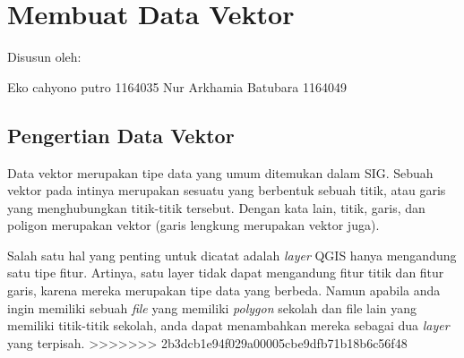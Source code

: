 

\section{Membuat Data Vektor}
Disusun oleh:

Eko cahyono putro 1164035
Nur Arkhamia Batubara 1164049

\subsection {Pengertian Data Vektor}
Data vektor merupakan tipe data yang umum ditemukan dalam SIG. Sebuah vektor pada intinya merupakan sesuatu yang berbentuk sebuah titik, atau garis yang menghubungkan titik-titik tersebut. Dengan kata lain, titik, garis, dan poligon merupakan vektor (garis lengkung merupakan vektor juga).

Salah satu hal yang penting untuk dicatat adalah \textit{layer} QGIS hanya mengandung satu tipe fitur. Artinya, satu layer tidak dapat mengandung fitur titik dan fitur garis, karena mereka merupakan tipe data yang berbeda. Namun apabila anda ingin memiliki sebuah \textit{file} yang memiliki \textit{polygon} sekolah dan file lain yang memiliki titik-titik sekolah, anda dapat menambahkan mereka sebagai dua \textit{layer} yang terpisah\cite{setiawan2018membuka}.
>>>>>>> 2b3dcb1e94f029a00005cbe9dfb71b18b6c56f48
